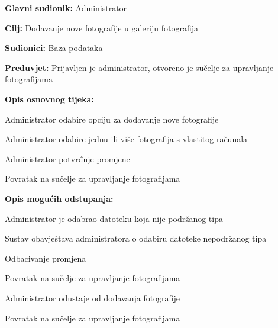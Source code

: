 					\noindent {}
					\begin{packed_item}
						
						\item \textbf{Glavni sudionik: }Administrator
						\item  \textbf{Cilj:} Dodavanje nove fotografije u galeriju fotografija
						\item  \textbf{Sudionici:} Baza podataka
						\item  \textbf{Preduvjet:} Prijavljen je administrator, otvoreno je sučelje za upravljanje fotografijama
						\item  \textbf{Opis osnovnog tijeka:}
						
						\item[] \begin{packed_enum}
							
							\item Administrator odabire opciju za dodavanje nove fotografije
							\item Administrator odabire jednu ili više fotografija s vlastitog računala
							\item Administrator potvrđuje promjene
							\item Povratak na sučelje za upravljanje fotografijama
						\end{packed_enum}
						
						\item  \textbf{Opis mogućih odstupanja:}
						
						\item[] \begin{packed_item}
							
							\item[2.a] Administrator je odabrao datoteku koja nije podržanog tipa
							\item[] \begin{packed_enum}
								
								\item Sustav obavještava administratora o odabiru datoteke nepodržanog tipa
								\item Odbacivanje promjena
								\item Povratak na sučelje za upravljanje fotografijama
								
							\end{packed_enum}
							
							\item[3.a] Administrator odustaje od dodavanja fotografije
							\item[] \begin{packed_enum}
								
								\item Povratak na sučelje za upravljanje fotografijama
							
							\end{packed_enum}
							
						\end{packed_item}
					\end{packed_item}
					
